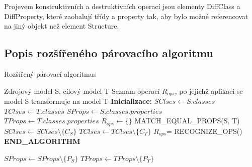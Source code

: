 \documentclass[11pt,twoside,a4paper]{book}
\begin{document}
 Projevem konstruktivních a destruktivních operací jsou elementy DiffClass a
 DiffProperty, které zaobalují třídy a property tak, aby bylo možné referencovat
 na jiný objekt než element Structure. 

\subsection{Popis rozšířeného párovacího algoritmu}
\begin{algorithm}
 \caption{Rozšířený párovací
 algoritmus}\label{algo:matching_ext:ops_recognition}

\begin{algorithmic}[1]
   \Require Zdrojový model S, cílový model T
   \Ensure Seznam operací $R_{ops}$, po jejichž aplikaci se model S transformuje
       na model T
   \Statex
   \State \textbf{Inicializace:}
   \State $SClses \gets S.classes$  
   \State $TClses \gets T.classes$ 
   \State $SProps \gets S.classes.properties$ 
   \State $TProps \gets T.classes.properties$ 
   \State $R_{ops} \gets \{\}$
   \State 
   \Statex	   
    \label{algo:matching:forEqualCls}
   	        \State MATCH\_EQUAL\_PROPS(S, T) 
   	        \State $SClses \gets SClses \setminus \{ C_S\}$
   	        \State $TClses \gets TClses \setminus \{ C_T\}$   	        
   	     \EndIf
      \EndFor
   \EndFor
   \State $R_{ops}$= RECOGNIZE\_OPS()
   \State \textbf{END\_ALGORITHM}
   
   \Statex	
   	           \State $SProps \gets SProps \setminus \{ P_S\}$
   	           \State $TProps \gets TProps \setminus \{ P_T\}$
   	        \EndIf
   	      \EndFor
   	   \EndFor
   \EndProcedure  
\end{algorithmic}
\end{algorithm}
\end{document}
